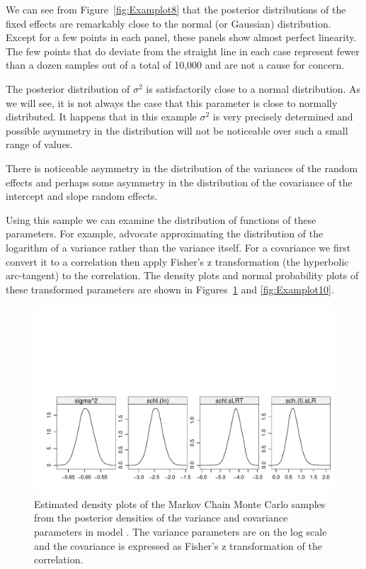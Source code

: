 \documentclass[12pt]{article}
\begin{document}
We can see from Figure~\ref{fig:Examplot8} that the posterior
distributions of the fixed effects are remarkably close to the normal
(or Gaussian) distribution.  Except for a few points in each panel,
these panels show almost perfect linearity.  The few points that do
deviate from the straight line in each case represent fewer than
a dozen samples out of a total of 10,000 and are not a cause for concern.

The posterior distribution of $\sigma^2$ is satisfactorily close to a
normal distribution.  As we will see, it is not always the case that
this parameter is close to normally distributed.  It happens that in
this example $\sigma^2$ is very precisely determined and possible
asymmetry in the distribution will not be noticeable over such a small
range of values.

There is noticeable asymmetry in the distribution of the variances of
the random effects and perhaps some asymmetry in the distribution of
the covariance of the intercept and slope random effects.

Using this sample we can examine the distribution of functions of
these parameters.  For example, \citep{box73:_bayes_infer_statis_analy} advocate
approximating the distribution of the logarithm of a variance rather
than the variance itself.  For a covariance we first convert it to a
correlation then apply Fisher's z transformation (the hyperbolic
arc-tangent) to the correlation.  The density plots and normal
probability plots of these transformed parameters are shown in
Figures~\ref{fig:Examplot9} and \ref{fig:Examplot10}.

\begin{figure}[tbp]
  \centering
  \includegraphics[width=\textwidth]{figs/SoftRev-Examplot9}
  \caption{Estimated density plots of the Markov Chain Monte Carlo
    samples from the posterior densities of the variance and
    covariance parameters in model .  The variance
    parameters are on the log scale and the covariance is expressed as
    Fisher's z transformation of the correlation.}
  \label{fig:Examplot9}
\end{figure}
\end{document}
